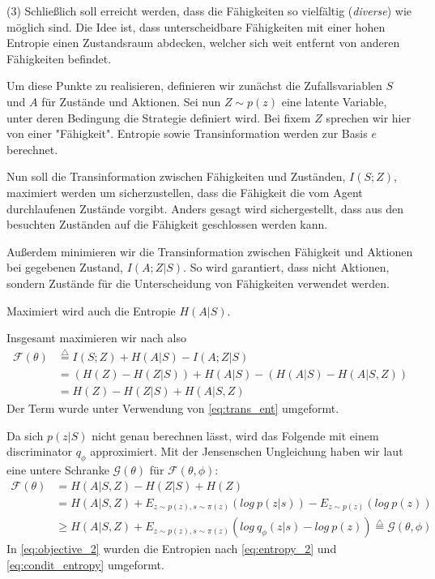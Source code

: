(3) Schließlich soll erreicht werden, dass die Fähigkeiten so vielfältig (\textit{diverse}) wie möglich sind. Die Idee ist, dass unterscheidbare Fähigkeiten mit einer hohen Entropie einen Zustandsraum abdecken, welcher sich weit entfernt von anderen Fähigkeiten befindet.

\smallspace

Um diese Punkte zu realisieren, definieren wir zunächst die Zufallsvariablen $ S $ und $ A $ für Zustände und Aktionen. Sei nun $ Z \sim p(z) $ eine latente Variable, unter deren Bedingung die Strategie definiert wird. Bei fixem $ Z $ sprechen wir hier von einer "Fähigkeit". Entropie sowie Transinformation werden zur Basis $ e $ berechnet.

Nun soll die Transinformation zwischen Fähigkeiten und Zuständen, $ I(S;Z) $, maximiert werden um sicherzustellen, dass die Fähigkeit die vom Agent durchlaufenen Zustände vorgibt. Anders gesagt wird sichergestellt, dass aus den besuchten Zuständen auf die Fähigkeit geschlossen werden kann.

Außerdem minimieren wir die Transinformation zwischen Fähigkeit und Aktionen bei gegebenen Zustand, $ I(A; Z | S) $. So wird garantiert, dass nicht Aktionen, sondern Zustände für die Unterscheidung von Fähigkeiten verwendet werden.

Maximiert wird auch die Entropie $ H(A|S) $.

\smallspace

Insgesamt maximieren wir nach \cite{diversity_eysenbach} also
\begin{align}
    \mathcal{F}(\theta) &\stackrel{\triangle}{=} I(S;Z) + H(A|S) - I(A;Z|S) \label{eq:objective_1}\\
    & = (H(Z) - H(Z|S)) + H(A|S) - (H(A|S) - H(A|S,Z)) \nonumber\\
    & = H(Z) - H(Z|S) + H(A|S,Z) \label{eq:objective_intuitive}
\end{align}
Der Term wurde unter Verwendung von \eqref{eq:trans_ent} umgeformt.

Da sich $ p(z|S) $ nicht genau berechnen lässt, wird das Folgende mit einem discriminator $ q_\phi $ approximiert. Mit der Jensenschen Ungleichung haben wir laut \cite{diversity_eysenbach} eine untere Schranke $ \mathcal{G}(\theta) $ für $ \mathcal{F}(\theta, \phi) $:
\begin{align}
    \mathcal{F}(\theta) & = H(A|S,Z) - H(Z|S) + H(Z) \nonumber\\
    & = H(A|S,Z) + E_{z \sim p(z), s \sim \pi(z)}(log\ p(z | s)) - E_{z \sim p(z)}(log\ p(z)) \label{eq:objective_2}\\
    & \ge H(A|S,Z) + E_{z \sim p(z), s \sim \pi(z)}(log\ q_\phi(z | s) - log\ p(z)) \stackrel{\triangle}{=} \mathcal{G}(\theta, \phi) \nonumber
\end{align}
In \eqref{eq:objective_2} wurden die Entropien nach \eqref{eq:entropy_2} und \eqref{eq:condit_entropy} umgeformt.

